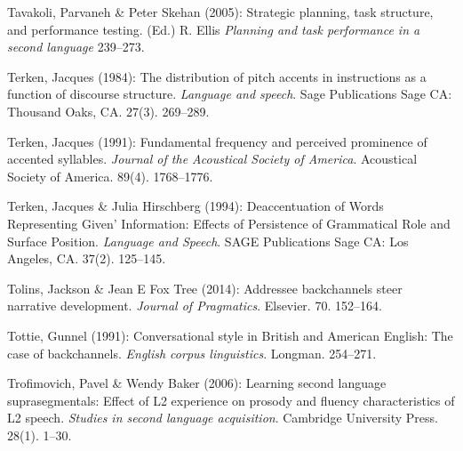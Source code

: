 \begin{styleBibliography}
Tavakoli, Parvaneh \& Peter Skehan (2005): Strategic planning, task structure, and performance testing. (Ed.) R. Ellis \textit{Planning and task performance in a second language} 239–273.
\end{styleBibliography}

\begin{styleBibliography}
Terken, Jacques (1984): The distribution of pitch accents in instructions as a function of discourse structure. \textit{Language and speech}. Sage Publications Sage CA: Thousand Oaks, CA. 27(3). 269–289.
\end{styleBibliography}

\begin{styleBibliography}
Terken, Jacques (1991): Fundamental frequency and perceived prominence of accented syllables. \textit{Journal of the Acoustical Society of America}. Acoustical Society of America. 89(4). 1768–1776.
\end{styleBibliography}

\begin{styleBibliography}
Terken, Jacques \& Julia Hirschberg (1994): Deaccentuation of Words Representing {\textasciigrave}Given’ Information: Effects of Persistence of Grammatical Role and Surface Position. \textit{Language and Speech}. SAGE Publications Sage CA: Los Angeles, CA. 37(2). 125–145.
\end{styleBibliography}

\begin{styleBibliography}
Tolins, Jackson \& Jean E Fox Tree (2014): Addressee backchannels steer narrative development. \textit{Journal of Pragmatics}. Elsevier. 70. 152–164.
\end{styleBibliography}

\begin{styleBibliography}
Tottie, Gunnel (1991): Conversational style in British and American English: The case of backchannels. \textit{English corpus linguistics}. Longman. 254–271.
\end{styleBibliography}

\begin{styleBibliography}
Trofimovich, Pavel \& Wendy Baker (2006): Learning second language suprasegmentals: Effect of L2 experience on prosody and fluency characteristics of L2 speech. \textit{Studies in second language acquisition}. Cambridge University Press. 28(1). 1–30.
\end{styleBibliography}

